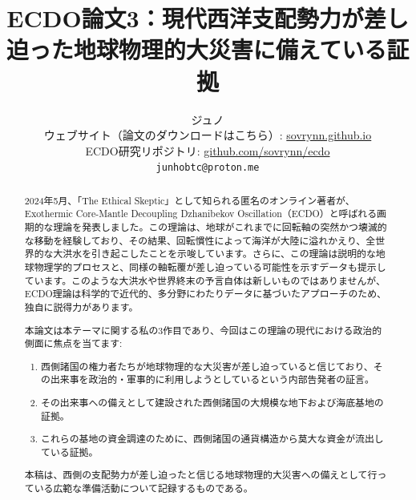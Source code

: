 \documentclass[10pt,twocolumn,letterpaper]{article}
\begin{document}
\title{ECDO論文3：現代西洋支配勢力が差し迫った地球物理的大災害に備えている証拠}

\author{ジュノ\\
ウェブサイト（論文のダウンロードはこちら）: \href{https://sovrynn.github.io}{sovrynn.github.io}\\
ECDO研究リポジトリ: \href{https://github.com/sovrynn/ecdo}{github.com/sovrynn/ecdo}\\
{\tt\small junhobtc@proton.me}
}

\maketitle

\begin{abstract}
2024年5月、「The Ethical Skeptic」として知られる匿名のオンライン著者が、Exothermic Core-Mantle Decoupling Dzhanibekov Oscillation（ECDO）\cite{1}と呼ばれる画期的な理論を発表しました\cite{0}。この理論は、地球がこれまでに回転軸の突然かつ壊滅的な移動を経験しており、その結果、回転慣性によって海洋が大陸に溢れかえり、全世界的な大洪水を引き起こしたことを示唆しています。さらに、この理論は説明的な地球物理学的プロセスと、同様の軸転覆が差し迫っている可能性を示すデータも提示しています。このような大洪水や世界終末の予言自体は新しいものではありませんが、ECDO理論は科学的で近代的、多分野にわたりデータに基づいたアプローチのため、独自に説得力があります。

本論文は本テーマに関する私の3作目\cite{2,3}であり、今回はこの理論の現代における政治的側面に焦点を当てます:

\begin{flushleft}
\begin{enumerate}
    \item 西側諸国の権力者たちが地球物理的な大災害が差し迫っていると信じており、その出来事を政治的・軍事的に利用しようとしているという内部告発者の証言。
    \item その出来事への備えとして建設された西側諸国の大規模な地下および海底基地の証拠。
    \item これらの基地の資金調達のために、西側諸国の通貨構造から莫大な資金が流出している証拠。
\end{enumerate}
\end{flushleft}

本稿は、西側の支配勢力が差し迫ったと信じる地球物理的大災害への備えとして行っている広範な準備活動について記録するものである。
\end{abstract}
\end{document}

